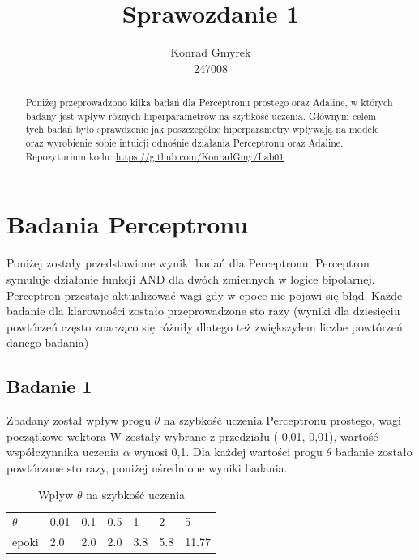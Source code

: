 \documentclass{article}
\title{ Sprawozdanie 1 }
\author{
  Konrad Gmyrek\\
  247008
}
\begin{document}

\maketitle

\begin{abstract}
  Poniżej przeprowadzono kilka badań dla Perceptronu prostego oraz Adaline, w których badany jest wpływ różnych hiperparametrów na szybkość uczenia. Głównym celem tych badań było sprawdzenie jak poszczególne hiperparametry wpływają na modele oraz wyrobienie sobie intuicji odnośnie działania Perceptronu oraz Adaline.\\Repozyturium kodu: \url{https://github.com/KonradGmy/Lab01}
\end{abstract}

\newpage
\section{Badania Perceptronu}

Poniżej zostały przedstawione wyniki badań dla Perceptronu. Perceptron symuluje działanie funkcji AND dla dwóch zmiennych w logice bipolarnej. Perceptron przestaje aktualizować wagi gdy w epoce nie pojawi się błąd. Każde badanie dla klarowności zostało przeprowadzone sto razy (wyniki dla dziesięciu powtórzeń często znacząco się różniły dlatego też zwiększyłem liczbe powtórzeń danego badania)

\subsection{Badanie 1}

Zbadany został wpływ progu $\theta$ na szybkość uczenia Perceptronu prostego, wagi początkowe wektora W zostały wybrane z przedziału (-0,01, 0,01), wartość współczynnika uczenia $\alpha$ wynosi 0,1. Dla każdej wartości progu $\theta$ badanie zostało powtórzone sto razy, poniżej uśrednione wyniki badania.\\


\begin{table}[h]
  \centering
  \caption{Wpływ $\theta$ na szybkość uczenia}
  \begin{tabular}{lllllll}
    \toprule
    $\theta$ & 0.01 & 0.1 & 0.5 & 1 & 2 & 5 \\
    epoki & 2.0 & 2.0 & 2.0 & 3.8 & 5.8 & 11.77 \\
    \bottomrule
  \end{tabular}
\end{table}
\end{document}
